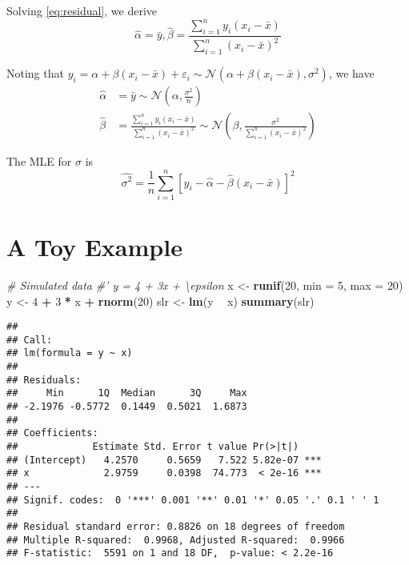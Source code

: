 \documentclass[
]{book}
\newenvironment{Shaded}{\begin{snugshade}}{\end{snugshade}}
\newcommand{\CommentTok}[1]{\textcolor[rgb]{0.56,0.35,0.01}{\textit{#1}}}
\newcommand{\DataTypeTok}[1]{\textcolor[rgb]{0.13,0.29,0.53}{#1}}
\newcommand{\DecValTok}[1]{\textcolor[rgb]{0.00,0.00,0.81}{#1}}
\newcommand{\KeywordTok}[1]{\textcolor[rgb]{0.13,0.29,0.53}{\textbf{#1}}}
\newcommand{\NormalTok}[1]{#1}
\newcommand{\OperatorTok}[1]{\textcolor[rgb]{0.81,0.36,0.00}{\textbf{#1}}}
\newcommand{\StringTok}[1]{\textcolor[rgb]{0.31,0.60,0.02}{#1}}
\theoremstyle{definition}
\theoremstyle{definition}
\theoremstyle{definition}
\theoremstyle{remark}
\begin{document}
Solving \eqref{eq:residual}, we derive
\begin{equation}
\hat\alpha = \bar y, \hat\beta = \frac{\sum_{i=1}^{n} y_{i}\left(x_{i}-\bar{x}\right)}{\sum_{i=1}^{n}\left(x_{i}-\bar{x}\right)^{2}}
\end{equation}

Noting that \(y_i = \alpha+\beta(x_i-\bar x)+\varepsilon_i\sim\mathcal{N}(\alpha+\beta(x_i-\bar x), \sigma^2)\), we have
\begin{align}
\hat\alpha &= \bar y \sim \mathcal{N}(\alpha, \frac{\sigma^2}{n})\\
\hat\beta &= \frac{\sum_{i=1}^{n} y_{i}\left(x_{i}-\bar{x}\right)}{\sum_{i=1}^{n}\left(x_{i}-\bar{x}\right)^{2}}
\sim \mathcal{N}(\beta, \frac{\sigma^2}{\sum_{i=1}^n(x_i-\bar x)^2})
\end{align}

The MLE for \(\sigma\) is
\begin{equation}
\hat{\sigma^{2}}=\frac{1}{n} \sum_{i=1}^{n}\left[y_{i}-\hat{\alpha}-\hat{\beta}\left(x_{i}-\bar{x}\right)\right]^{2}
\end{equation}

\hypertarget{a-toy-example}{%
\section{A Toy Example}\label{a-toy-example}}

\begin{Shaded}
\begin{Highlighting}[]
\CommentTok{# Simulated data}
\CommentTok{#' y = 4 + 3x + \textbackslash{}epsilon}
\NormalTok{x <-}\StringTok{ }\KeywordTok{runif}\NormalTok{(}\DecValTok{20}\NormalTok{, }\DataTypeTok{min =} \DecValTok{5}\NormalTok{, }\DataTypeTok{max =} \DecValTok{20}\NormalTok{)}
\NormalTok{y <-}\StringTok{ }\DecValTok{4} \OperatorTok{+}\StringTok{ }\DecValTok{3} \OperatorTok{*}\StringTok{ }\NormalTok{x }\OperatorTok{+}\StringTok{ }\KeywordTok{rnorm}\NormalTok{(}\DecValTok{20}\NormalTok{)}
\NormalTok{slr <-}\StringTok{ }\KeywordTok{lm}\NormalTok{(y }\OperatorTok{~}\StringTok{ }\NormalTok{x)}
\KeywordTok{summary}\NormalTok{(slr)}
\end{Highlighting}
\end{Shaded}

\begin{verbatim}
## 
## Call:
## lm(formula = y ~ x)
## 
## Residuals:
##     Min      1Q  Median      3Q     Max 
## -2.1976 -0.5772  0.1449  0.5021  1.6873 
## 
## Coefficients:
##             Estimate Std. Error t value Pr(>|t|)    
## (Intercept)   4.2570     0.5659   7.522 5.82e-07 ***
## x             2.9759     0.0398  74.773  < 2e-16 ***
## ---
## Signif. codes:  0 '***' 0.001 '**' 0.01 '*' 0.05 '.' 0.1 ' ' 1
## 
## Residual standard error: 0.8826 on 18 degrees of freedom
## Multiple R-squared:  0.9968, Adjusted R-squared:  0.9966 
## F-statistic:  5591 on 1 and 18 DF,  p-value: < 2.2e-16
\end{verbatim}
\end{document}
